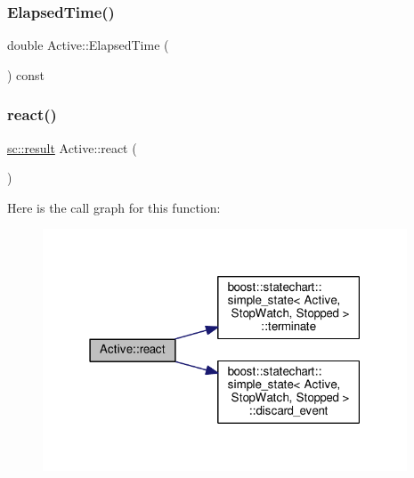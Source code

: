 \mbox{\label{struct_active_adc392561063b506262e24bca87a74f43}} 
\subsubsection{\texorpdfstring{Elapsed\+Time()}{ElapsedTime()}\hspace{0.1cm}{\footnotesize\ttfamily [4/4]}}
{\footnotesize\ttfamily double Active\+::\+Elapsed\+Time (\begin{DoxyParamCaption}{ }\end{DoxyParamCaption}) const\hspace{0.3cm}{\ttfamily [inline]}}

\mbox{\label{struct_active_afe9a0390ef2231d6e36bc7ca49e5220a}} 
\subsubsection{\texorpdfstring{react()}{react()}\hspace{0.1cm}{\footnotesize\ttfamily [1/2]}}
{\footnotesize\ttfamily \mbox{\hyperlink{namespaceboost_1_1statechart_abe807f6598b614d6d87bb951ecd92331}{sc\+::result}} Active\+::react (\begin{DoxyParamCaption}\item[{const \mbox{\hyperlink{struct_ev_request_shutdown}{Ev\+Request\+Shutdown}} \&}]{ }\end{DoxyParamCaption})}

Here is the call graph for this function\+:
\nopagebreak
\begin{figure}[H]
\begin{center}
\leavevmode
\includegraphics[width=307pt]{struct_active_afe9a0390ef2231d6e36bc7ca49e5220a_cgraph}
\end{center}
\end{figure}
\mbox{\label{struct_active_a173c792f4e486c497ad10ebc5add135e}} 
